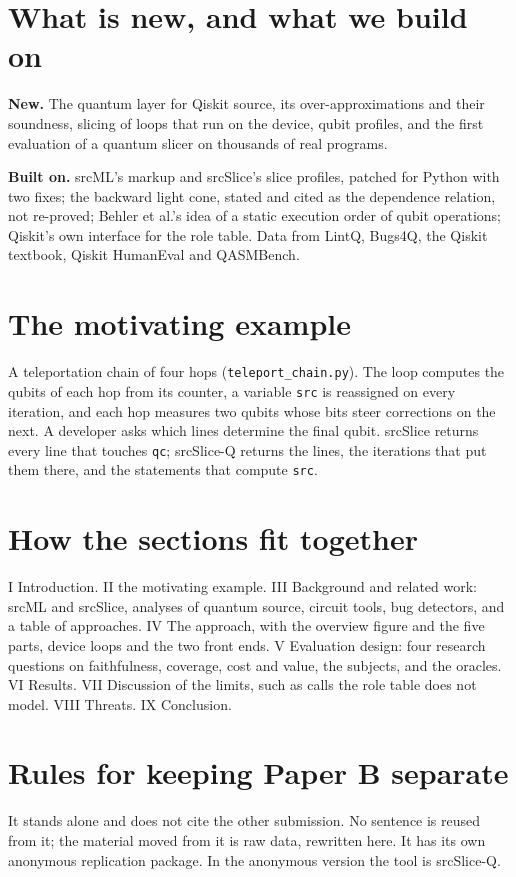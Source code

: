 \documentclass[10pt]{article}
\newcommand{\tool}{srcSlice-Q}
\begin{document}
\section*{What is new, and what we build on}
\textbf{New.} The quantum layer for Qiskit source, its over-approximations and their soundness, slicing of loops that
run on the device, qubit profiles, and the first evaluation of a quantum slicer on thousands of real programs.

\textbf{Built on.} srcML's markup and srcSlice's slice profiles, patched for Python with two fixes; the backward light
cone, stated and cited as the dependence relation, not re-proved; Behler et al.'s idea of a static execution order of
qubit operations; Qiskit's own interface for the role table. Data from LintQ, Bugs4Q, the Qiskit textbook, Qiskit
HumanEval and QASMBench.

\section*{The motivating example}
A teleportation chain of four hops (\texttt{teleport\_chain.py}). The loop computes the qubits of each hop from its
counter, a variable \texttt{src} is reassigned on every iteration, and each hop measures two qubits whose bits steer
corrections on the next. A developer asks which lines determine the final qubit. srcSlice returns every line that
touches \texttt{qc}; \tool{} returns the lines, the iterations that put them there, and the statements that compute
\texttt{src}.

\section*{How the sections fit together}
I Introduction. II the motivating example. III Background and related work: srcML and srcSlice, analyses of quantum
source, circuit tools, bug detectors, and a table of approaches. IV The approach, with the overview figure and the
five parts, device loops and the two front ends. V Evaluation design: four research questions on faithfulness,
coverage, cost and value, the subjects, and the oracles. VI Results. VII Discussion of the limits, such as calls the
role table does not model. VIII Threats. IX Conclusion.

\section*{Rules for keeping Paper B separate}
It stands alone and does not cite the other submission. No sentence is reused from it; the material moved from it is
raw data, rewritten here. It has its own anonymous replication package. In the anonymous version the tool is
\tool{}.
\end{document}
